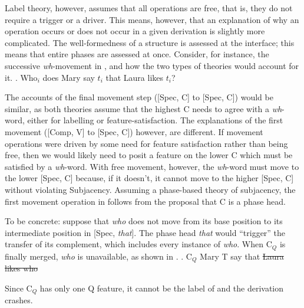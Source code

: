 Label theory, however, assumes that all operations are free, that is, they do not require a trigger or a driver.
This means, however, that an explanation of why an operation occurs or does not occur in a given derivation is slightly more complicated.
The well-formedness of a structure is assessed at the interface; this means that entire phases are assessed at once.
Consider, for instance, the successive \textit{wh}-movement in \Next, and how the two types of theories would account for it.
\ex. Who$_i$ does Mary say $t_i$ that Laura likes $t_i$?

The accounts of the final movement step ([Spec, C] to [Spec, C]) would be similar, as both theories assume that the highest C needs to agree with a \textit{wh}-word, either for labelling or feature-satisfaction.
The explanations of the first movement ([Comp, V] to [Spec, C]) however, are different.
If movement operations were driven by some need for feature satisfaction rather than being free, then we would likely need to posit a feature on the lower C which must be satisfied by a \textit{wh}-word.
With free movement, however, the \textit{wh}-word must move to the lower [Spec, C] because, if it doesn't, it cannot move to the higher [Spec, C] without violating Subjacency.
Assuming a phase-based theory of subjacency, the first movement operation in \Last follows from the proposal that C is a phase head.

To be concrete: suppose that \textit{who} does not move from its base position to its intermediate position in [Spec, \textit{that}].
The phase head \textit{that} would ``trigger'' the transfer of its complement, which includes every instance of \textit{who}.
When C$_{Q}$ is finally merged, \textit{who} is unavailable, as shown in \Next. 
\ex. C$_{Q}$ Mary T say that \sout{Laura likes who}

Since C$_{Q}$ has only one Q feature, it cannot be the label of \Last and the derivation crashes.

